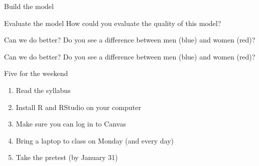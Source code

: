 \documentclass{beamer}\usepackage[]{graphicx}\usepackage[]{color}
\newenvironment{knitrout}{}{} %
\begin{document}
\begin{darkframes}
\begin{frame}{Build the model}
\begin{center}
      \end{center}
    \end{frame}

    \begin{frame}{Evaluate the model}
      How could you evaluate the quality of this model?
    \end{frame}

    \begin{frame}{Can we do better?}
      Do you see a difference between men (blue) and women (red)?

\begin{knitrout}


\end{knitrout}
    \end{frame}

    \begin{frame}{Can we do better?}
      Do you see a difference between men (blue) and women (red)?

\begin{knitrout}


\end{knitrout}
    \end{frame}

    \begin{frame}{Five for the weekend}
      \begin{enumerate}
        \item Read the syllabus
        \item Install R and RStudio on your computer
        \item Make sure you can log in to Canvas
        \item Bring a laptop to class on Monday (and every day)
        \item Take the pretest (by January 31)
      \end{enumerate}
    \end{frame}


  \end{darkframes}
\end{document}
